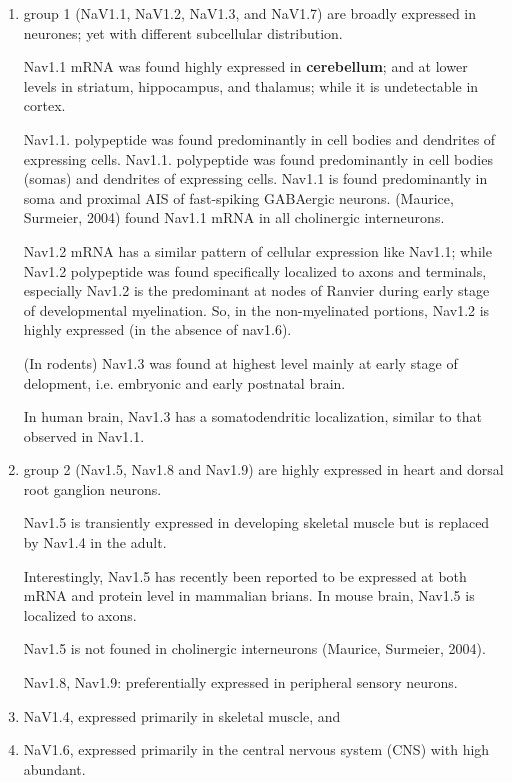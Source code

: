 \begin{enumerate}
  \item  group 1 (NaV1.1, NaV1.2, NaV1.3, and NaV1.7) are broadly expressed in
  neurones; yet with different subcellular distribution.

Nav1.1 mRNA was found highly expressed in {\bf cerebellum}; and at lower levels
in striatum, hippocampus, and thalamus; while it is undetectable in cortex.

Nav1.1. polypeptide was found predominantly in cell bodies and dendrites of
expressing cells. 
Nav1.1. polypeptide was found predominantly in cell bodies (somas) and dendrites
of expressing cells. Nav1.1 is found predominantly in soma and proximal AIS of
fast-spiking GABAergic neurons. (Maurice, Surmeier, 2004) found Nav1.1 mRNA in
all cholinergic interneurons.


Nav1.2 mRNA has a similar pattern of cellular expression like Nav1.1; while
Nav1.2 polypeptide was found specifically localized to axons and terminals,
especially Nav1.2 is the predominant at nodes of Ranvier during early
stage of developmental myelination. So, in the non-myelinated portions, Nav1.2
is highly expressed (in the absence of nav1.6).

(In rodents) Nav1.3 was found at highest level mainly at early stage of
delopment, i.e. embryonic and early postnatal brain. 

In human brain, Nav1.3 has a somatodendritic localization, similar to that
observed in Nav1.1.
  
  \item group 2 (Nav1.5, Nav1.8 and Nav1.9) are highly expressed in heart and
  dorsal root ganglion neurons. 

  Nav1.5 is transiently expressed in developing skeletal muscle but is replaced
  by Nav1.4 in the adult.
  
  Interestingly, Nav1.5 has recently been reported to be expressed at both mRNA
  and protein level in mammalian brians. In mouse brain, Nav1.5 is localized to
  axons.
  
  Nav1.5 is not founed in cholinergic interneurons (Maurice, Surmeier, 2004).
  
  Nav1.8, Nav1.9: preferentially expressed in peripheral sensory neurons.


  \item NaV1.4, expressed primarily in skeletal muscle, and 
  
  \item NaV1.6, expressed primarily in the central nervous system (CNS) with
  high abundant.


\end{enumerate}
